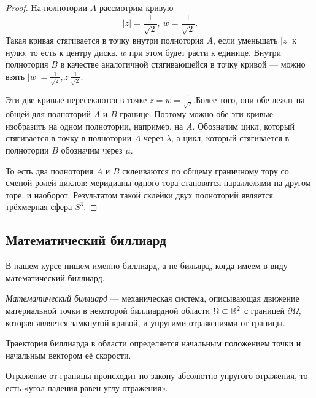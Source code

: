 \begin{proof}
    На полнотории $A$ рассмотрим кривую
    \[|z| = \frac{1}{\sqrt2}, \ w = \frac{1}{\sqrt2}.\]
    Такая кривая стягивается в точку внутри полнотория $A$, если уменьшать $|z|$ к нулю, то есть к центру диска. $w$ при этом будет расти к единице. Внутри полнотория $B$ в качестве аналогичной стягивающейся в точку кривой — можно взять $|w| = \frac{1}{\sqrt2}, z \ \frac{1}{\sqrt2}$.

    Эти две кривые пересекаются в точке $z = w = \frac{1}{\sqrt2}$.Более того, они обе лежат на общей для полноторий $A$ и $B$ границе. Поэтому можно обе эти кривые изобразить на одном полнотории, например, на $A$. Обозначим цикл, который стягивается в точку в полнотории $A$ через $\lambda$, а цикл, который стягивается в полнотории $B$ обозначим через $\mu$.

    То есть два полнотория $A$ и $B$ склеиваются по общему граничному тору со сменой ролей циклов: меридианы одного тора становятся параллелями на другом торе, и наоборот. Результатом такой склейки двух полноторий является трёхмерная сфера $S^3$.
\end{proof} 


\subsection{Математический биллиард}
В нашем курсе пишем именно биллиард, а не бильярд, когда имеем в виду математический биллиард.
\begin{definition}
    \textit{Математический биллиард} — механическая система, описывающая движение материальной точки в некоторой биллиардной области $\Omega \subset \mathbb{R}^2$ с границей $\partial \Omega$, которая является замкнутой кривой, и упругими отражениями от границы.
\end{definition} 

\begin{remark}
    Траектория биллиарда в области определяется начальным положением точки и начальным вектором её скорости.
\end{remark}


\begin{remark}
    Отражение от границы происходит по закону абсолютно упругого отражения, то есть «угол падения равен углу отражения».
\end{remark}

